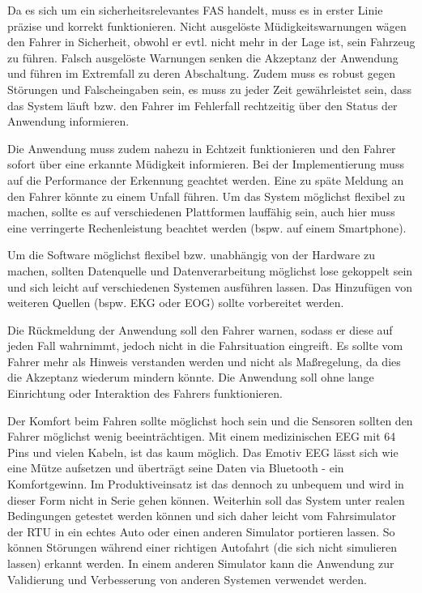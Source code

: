\label{chap:requirements}
Da es sich um ein sicherheitsrelevantes \acl{FAS} handelt, muss es in erster Linie präzise und korrekt funktionieren. Nicht ausgelöste Müdigkeitswarnungen wägen den Fahrer in Sicherheit, obwohl er evtl. nicht mehr in der Lage ist, sein Fahrzeug zu führen. Falsch ausgelöste Warnungen senken die Akzeptanz der Anwendung und führen im Extremfall zu deren   Abschaltung. Zudem muss es robust gegen Störungen und Falscheingaben sein, es muss zu jeder Zeit gewährleistet sein, dass das System läuft bzw. den Fahrer im Fehlerfall rechtzeitig über den Status der Anwendung informieren.

Die Anwendung muss zudem nahezu in Echtzeit funktionieren und den Fahrer sofort über eine erkannte Müdigkeit informieren. Bei der Implementierung muss auf die Performance der Erkennung geachtet werden. Eine zu späte Meldung an den Fahrer könnte zu einem Unfall führen. Um das System möglichst flexibel zu machen, sollte es auf verschiedenen Plattformen lauffähig sein, auch hier muss eine verringerte Rechenleistung beachtet werden (bspw. auf einem Smartphone).

Um die Software möglichst flexibel bzw. unabhängig von der Hardware zu machen, sollten Datenquelle und Datenverarbeitung möglichst lose gekoppelt sein und sich leicht auf verschiedenen Systemen ausführen lassen. Das Hinzufügen von weiteren Quellen (bspw. EKG oder EOG) sollte vorbereitet werden.

Die Rückmeldung der Anwendung soll den Fahrer warnen, sodass er diese auf jeden Fall wahrnimmt, jedoch nicht in die Fahrsituation eingreift. Es sollte vom Fahrer mehr als Hinweis verstanden werden und nicht als Maßregelung, da dies die Akzeptanz wiederum mindern könnte. Die Anwendung soll ohne lange Einrichtung oder Interaktion des Fahrers funktionieren.

Der Komfort beim Fahren sollte möglichst hoch sein und die Sensoren sollten den Fahrer möglichst wenig beeinträchtigen. Mit einem medizinischen EEG mit 64 Pins und vielen Kabeln, ist das kaum möglich. Das Emotiv EEG lässt sich wie eine Mütze aufsetzen und überträgt seine Daten via Bluetooth - ein Komfortgewinn. Im Produktiveinsatz ist das dennoch zu unbequem und wird in dieser Form nicht in Serie gehen können.
Weiterhin soll das System unter realen Bedingungen getestet werden können und sich daher leicht vom Fahrsimulator der \acl{RTU} in ein echtes Auto oder einen anderen Simulator portieren lassen. So können Störungen während einer richtigen Autofahrt (die sich nicht simulieren lassen) erkannt werden. In einem anderen Simulator kann die Anwendung zur Validierung und Verbesserung von anderen Systemen verwendet werden.


